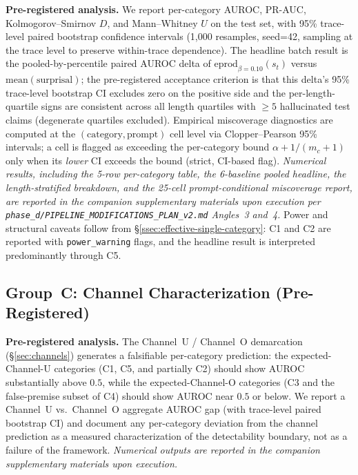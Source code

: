 \documentclass[runningheads]{llncs}
\begin{document}
\textbf{Pre-registered analysis.} We report per-category AUROC, PR-AUC,
Kolmogorov--Smirnov $D$, and Mann--Whitney $U$ on the test set, with 95\%
trace-level paired bootstrap confidence intervals (1{,}000 resamples,
seed=42, sampling at the trace level to preserve within-trace dependence).
The headline batch result is the pooled-by-percentile paired AUROC delta
of $\text{eprod}_{\beta=0.10}(s_t)$ versus $\text{mean}(\text{surprisal})$;
the pre-registered acceptance criterion is that this delta's 95\%
trace-level bootstrap CI excludes zero on the positive side and the
per-length-quartile signs are consistent across all length quartiles with
$\ge 5$ hallucinated test claims (degenerate quartiles excluded). Empirical
miscoverage diagnostics are computed at the
$(\text{category}, \text{prompt})$ cell level via Clopper--Pearson 95\%
intervals; a cell is flagged as exceeding the per-category bound
$\alpha + 1/(m_c+1)$ only when its \emph{lower} CI exceeds the bound
(strict, CI-based flag). \emph{Numerical results, including the 5-row
per-category table, the 6-baseline pooled headline, the length-stratified
breakdown, and the 25-cell prompt-conditional miscoverage report, are
reported in the companion supplementary materials upon execution per
\texttt{phase\_d/PIPELINE\_MODIFICATIONS\_PLAN\_v2.md} Angles~3 and~4.}
Power and structural caveats follow from
\S\ref{ssec:effective-single-category}: C1 and C2 are reported with
\texttt{power\_warning} flags, and the headline result is interpreted
predominantly through C5.

\subsection{Group~C: Channel Characterization (Pre-Registered)}
\label{ssec:results-groupC}

\textbf{Pre-registered analysis.} The Channel~U / Channel~O demarcation
(\S\ref{sec:channels}) generates a falsifiable per-category prediction:
the expected-Channel-U categories (C1, C5, and partially C2) should show
AUROC substantially above $0.5$, while the expected-Channel-O categories
(C3 and the false-premise subset of C4) should show AUROC near $0.5$ or
below. We report a Channel~U vs.\ Channel~O aggregate AUROC gap (with
trace-level paired bootstrap CI) and document any per-category deviation
from the channel prediction as a measured characterization of the
detectability boundary, not as a failure of the framework.
\emph{Numerical outputs are reported in the companion supplementary
materials upon execution.}
\end{document}
